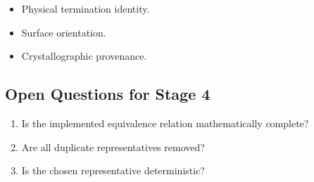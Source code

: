 \begin{itemize}
\item Physical termination identity.
\item Surface orientation.
\item Crystallographic provenance.
\end{itemize}

\subsection{Open Questions for Stage 4}

\begin{enumerate}
\item Is the implemented equivalence relation mathematically complete?
\item Are all duplicate representatives removed?
\item Is the chosen representative deterministic?
\end{enumerate}

